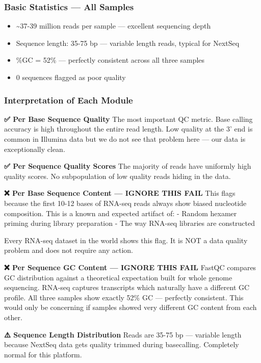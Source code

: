 \documentclass[
]{article}
\providecommand{\tightlist}{%
  \setlength{\itemsep}{0pt}\setlength{\parskip}{0pt}}
\begin{document}
\subsubsection{Basic Statistics --- All
Samples}\label{basic-statistics-all-samples}

\begin{itemize}
\tightlist
\item
  \textasciitilde37-39 million reads per sample --- excellent sequencing
  depth
\item
  Sequence length: 35-75 bp --- variable length reads, typical for
  NextSeq
\item
  \%GC = 52\% --- perfectly consistent across all three samples
\item
  0 sequences flagged as poor quality
\end{itemize}

\subsubsection{Interpretation of Each
Module}\label{interpretation-of-each-module}

\textbf{✅ Per Base Sequence Quality} The most important QC metric. Base
calling accuracy is high throughout the entire read length. Low quality
at the 3' end is common in Illumina data but we do not see that problem
here --- our data is exceptionally clean.

\textbf{✅ Per Sequence Quality Scores} The majority of reads have
uniformly high quality scores. No subpopulation of low quality reads
hiding in the data.

\textbf{❌ Per Base Sequence Content --- IGNORE THIS FAIL} This flags
because the first 10-12 bases of RNA-seq reads always show biased
nucleotide composition. This is a known and expected artifact of: -
Random hexamer priming during library preparation - The way RNA-seq
libraries are constructed

Every RNA-seq dataset in the world shows this flag. It is NOT a data
quality problem and does not require any action.

\textbf{❌ Per Sequence GC Content --- IGNORE THIS FAIL} FastQC compares
GC distribution against a theoretical expectation built for whole genome
sequencing. RNA-seq captures transcripts which naturally have a
different GC profile. All three samples show exactly 52\% GC ---
perfectly consistent. This would only be concerning if samples showed
very different GC content from each other.

\textbf{⚠️ Sequence Length Distribution} Reads are 35-75 bp --- variable
length because NextSeq data gets quality trimmed during basecalling.
Completely normal for this platform.
\end{document}
